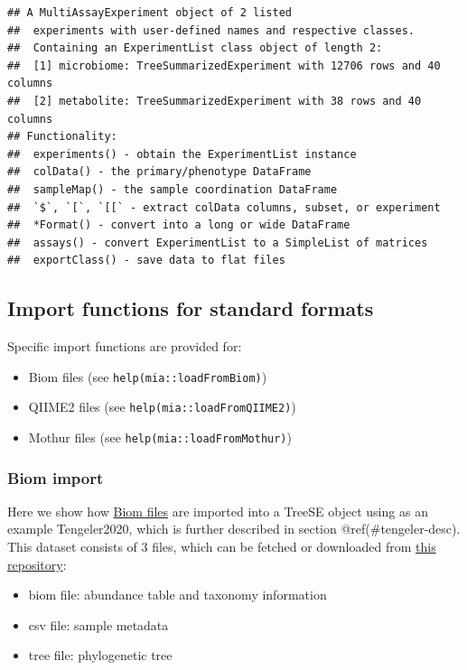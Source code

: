 \documentclass[
]{book}
\providecommand{\tightlist}{%
  \setlength{\itemsep}{0pt}\setlength{\parskip}{0pt}}
\begin{document}
\begin{verbatim}
## A MultiAssayExperiment object of 2 listed
##  experiments with user-defined names and respective classes.
##  Containing an ExperimentList class object of length 2:
##  [1] microbiome: TreeSummarizedExperiment with 12706 rows and 40 columns
##  [2] metabolite: TreeSummarizedExperiment with 38 rows and 40 columns
## Functionality:
##  experiments() - obtain the ExperimentList instance
##  colData() - the primary/phenotype DataFrame
##  sampleMap() - the sample coordination DataFrame
##  `$`, `[`, `[[` - extract colData columns, subset, or experiment
##  *Format() - convert into a long or wide DataFrame
##  assays() - convert ExperimentList to a SimpleList of matrices
##  exportClass() - save data to flat files
\end{verbatim}

\hypertarget{import-functions-for-standard-formats}{%
\subsection{Import functions for standard formats}\label{import-functions-for-standard-formats}}

Specific import functions are provided for:

\begin{itemize}
\tightlist
\item
  Biom files (see \texttt{help(mia::loadFromBiom)})
\item
  QIIME2 files (see \texttt{help(mia::loadFromQIIME2)})
\item
  Mothur files (see \texttt{help(mia::loadFromMothur)})
\end{itemize}

\hypertarget{biom-import}{%
\subsubsection{Biom import}\label{biom-import}}

Here we show how \href{https://biom-format.org/}{Biom files} are imported into
a TreeSE object using as an example Tengeler2020, which is further described in section @ref(\#tengeler-desc). This dataset consists of 3 files, which can be
fetched or downloaded from
\href{https://github.com/microbiome/data/tree/main/Tengeler2020}{this repository}:

\begin{itemize}
\tightlist
\item
  biom file: abundance table and taxonomy information
\item
  csv file: sample metadata
\item
  tree file: phylogenetic tree
\end{itemize}
\end{document}
